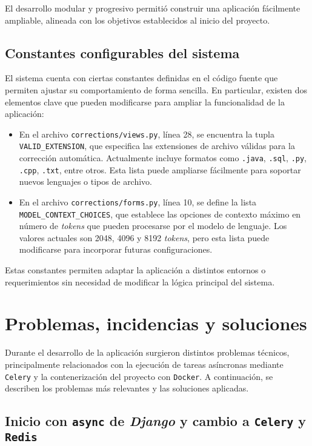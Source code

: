 El desarrollo modular y progresivo permitió construir una aplicación fácilmente ampliable, alineada con los objetivos establecidos al inicio del proyecto.

\subsection{Constantes configurables del sistema}

El sistema cuenta con ciertas constantes definidas en el código fuente que permiten ajustar su comportamiento de forma sencilla. En particular, existen dos elementos clave que pueden modificarse para ampliar la funcionalidad de la aplicación:

\begin{itemize}
    \item En el archivo \texttt{corrections/views.py}, línea 28, se encuentra la tupla \texttt{VALID\_EXTENSION}, que especifica las extensiones de archivo válidas para la corrección automática. Actualmente incluye formatos como \texttt{.java}, \texttt{.sql}, \texttt{.py}, \texttt{.cpp}, \texttt{.txt}, entre otros. Esta lista puede ampliarse fácilmente para soportar nuevos lenguajes o tipos de archivo.
    
    \item En el archivo \texttt{corrections/forms.py}, línea 10, se define la lista \texttt{MODEL\_CONTEXT\_CHOICES}, que establece las opciones de contexto máximo en número de \textit{tokens} que pueden procesarse por el modelo de lenguaje. Los valores actuales son 2048, 4096 y 8192 \textit{tokens}, pero esta lista puede modificarse para incorporar futuras configuraciones.
\end{itemize}

Estas constantes permiten adaptar la aplicación a distintos entornos o requerimientos sin necesidad de modificar la lógica principal del sistema.


\section{Problemas, incidencias y soluciones}

Durante el desarrollo de la aplicación surgieron distintos problemas técnicos, principalmente relacionados con la ejecución de tareas asíncronas mediante \texttt{Celery} y la contenerización del proyecto con \texttt{Docker}. A continuación, se describen los problemas más relevantes y las soluciones aplicadas.

\subsection*{Inicio con \texttt{async} de \textit{Django} y cambio a \texttt{Celery} y \texttt{Redis}}

